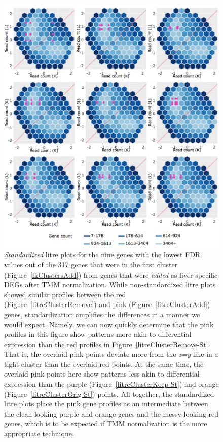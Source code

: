 \documentclass{article}
\begin{document}
  \null
  \begin{figure}[t!]
  \centerline{\includegraphics[width=\columnwidth]{../MakeFigures/Dashboards/litreClusterAdd-St/litreClusterAdd-St.jpg}}
  \caption{\textit{Standardized} litre plots for the nine genes with the lowest FDR values out of the 317 genes that were in the first cluster (Figure~\ref{lkClustersAdd}) from genes that were \textit{added} as liver-specific DEGs after TMM normalization. While non-standardized litre plots showed similar profiles between the red (Figure~\ref{litreClusterRemove}) and pink (Figure~\ref{litreClusterAdd}) genes, standardization amplifies the differences in a manner we would expect. Namely, we can now quickly determine that the pink profiles in this figure show patterns more akin to differential expression than the red profiles in Figure~\ref{litreClusterRemove-St}. That is, the overlaid pink points deviate more from the \textit{x=y} line in a tight cluster than the overlaid red points. At the same time, the overlaid pink points here show patterns less akin to differential expression than the purple (Figure~\ref{litreClusterKeep-St}) and orange (Figure~\ref{litreClusterOrig-St}) points. All together, the standardized litre plots place the pink gene profiles as an intermediate between the clean-looking purple and orange genes and the messy-looking red genes, which is to be expected if TMM normalization is the more appropriate technique.
  \label{litreClusterAdd-St}}
  \end{figure}
  
  
\end{document}

